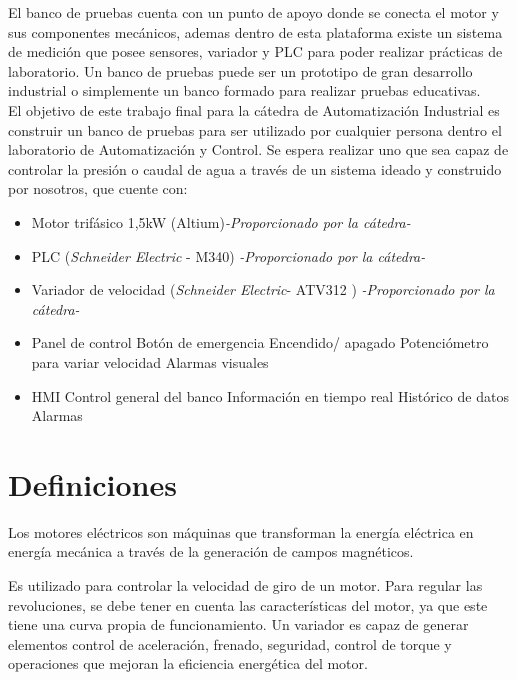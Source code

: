 El banco de pruebas cuenta con un punto de apoyo donde se conecta el motor y sus componentes mecánicos, ademas dentro de esta plataforma existe un sistema de medición que posee sensores, variador y PLC para poder realizar prácticas de laboratorio.
Un banco de pruebas puede ser un prototipo de gran desarrollo industrial o simplemente un banco formado para realizar pruebas educativas. \\

El objetivo de este trabajo final para la cátedra de Automatización Industrial es construir un banco de pruebas para ser utilizado por cualquier persona dentro el laboratorio de Automatización y Control. Se espera realizar uno que sea capaz de controlar la presión o caudal de agua a través de un sistema ideado y construido por nosotros, que cuente con:
\begin{itemize}
    \item Motor trifásico 1,5kW (Altium)\textit{-Proporcionado por la cátedra-}
    \item PLC (\textit{Schneider Electric} - M340) \textit{-Proporcionado por la cátedra-}
    \item Variador de velocidad (\textit{Schneider Electric}- ATV312 ) \textit{-Proporcionado por la cátedra-}
    \item Panel de control
        \subitem Botón de emergencia
        \subitem Encendido/ apagado
        \subitem Potenciómetro para variar velocidad
        \subitem Alarmas visuales
    \item HMI
        \subitem Control general del banco
        \subitem Información en tiempo real
        \subitem Histórico de datos
        \subitem Alarmas
\end{itemize}


\newpage

\section{Definiciones}
\begin{tcolorbox}[colback=blue!5!white,colframe=blue!75!black,title=Motor eléctrico]
	Los motores eléctricos son máquinas que transforman la energía eléctrica en energía mecánica a través de la generación de campos magnéticos.
\end{tcolorbox}

\begin{tcolorbox}[colback=blue!5!white,colframe=blue!75!black,title=Variador de velocidad]
	Es utilizado para controlar la velocidad de giro de un motor.
	Para regular las revoluciones, se debe tener en cuenta las características del motor, ya que este tiene una curva propia de funcionamiento. Un variador es capaz de generar elementos control de aceleración, frenado, seguridad, control de torque y operaciones que mejoran la eficiencia energética del motor.
\end{tcolorbox}

